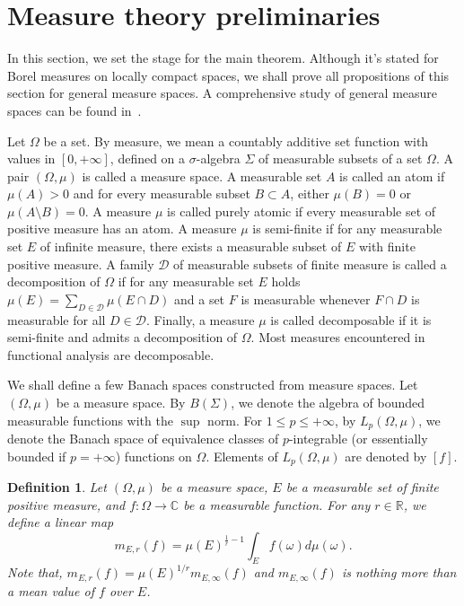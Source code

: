 \documentclass[12pt]{article}
\newtheorem{definition}[theorem]{Definition}
\begin{document}

\section{Measure theory preliminaries}
\label{MeasThPrelim}

In this section, we set the stage for the main theorem. Although it's stated 
for Borel measures on locally compact spaces, we shall prove all propositions of 
this section for general measure spaces. A comprehensive study of general 
measure spaces can be found in~\cite{FremMeasTh2}.

Let $\Omega$ be a set. By measure, we mean a countably additive set function 
with values in $[0,+\infty]$, defined on a $\sigma$-algebra $\Sigma$ of 
measurable subsets of a set $\Omega$. A pair $(\Omega,\mu)$ is 
called a measure space. A measurable set $A$ is called an atom 
if $\mu(A)>0$ and for every measurable subset $B\subset A$, either $\mu(B)=0$ 
or $\mu(A\setminus B)=0$. A measure $\mu$ is called purely atomic if every 
measurable set of positive measure has an atom. A measure $\mu$ is semi-finite 
if for any measurable set $E$ of infinite measure, there exists a measurable 
subset of $E$ with finite positive measure. A family $\mathcal{D}$ of 
measurable subsets of finite measure is called a decomposition of $\Omega$ if 
for any measurable set $E$ holds $\mu(E)=\sum_{D\in\mathcal{D}}\mu(E\cap D)$ 
and a set $F$ is measurable whenever $F\cap D$ is measurable for 
all $D\in\mathcal{D}$. Finally, a measure $\mu$ is called decomposable if it 
is semi-finite and admits a decomposition of $\Omega$. Most measures 
encountered in functional analysis are decomposable. 

We shall define a few Banach spaces constructed from measure spaces. 
Let $(\Omega,\mu)$ be a measure space. By $B(\Sigma)$, we denote the algebra of 
bounded measurable functions with the $\sup$ norm. For $1\leq p\leq +\infty$, 
by $L_p(\Omega,\mu)$, we denote the Banach space of equivalence classes of 
$p$-integrable (or essentially bounded if $p=+\infty$) functions on $\Omega$. 
Elements of $L_p(\Omega,\mu)$ are denoted by $[f]$.

\begin{definition}\label{GnrlzdMean}
    Let $(\Omega,\mu)$ be a measure space, $E$ be a measurable set of finite 
    positive measure, and $f:\Omega\to\mathbb{C}$ be a measurable function. For 
    any $r\in\mathbb{R}$, we define a linear map
    \[
        m_{E,r}(f)=\mu(E)^{\frac{1}{r}-1}\int_E f(\omega)d\mu(\omega).
    \]
    Note that, $m_{E,r}(f)=\mu(E)^{1/r}m_{E,\infty}(f)$ and $m_{E,\infty}(f)$ is 
    nothing more than a mean value of $f$ over $E$.
\end{definition}
\end{document}
